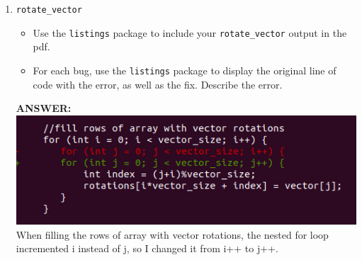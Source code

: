 \begin{enumerate}
    \item \texttt{rotate\_vector}
    \begin{itemize}
        \item Use the \texttt{listings} package to include your \texttt{rotate\_vector} output in the pdf.
        \item For each bug, use the \texttt{listings} package to display the original line of code with the error, as well as the fix.  Describe the error.
    \end{itemize}
    \textbf{ANSWER:} 
    \includegraphics[width=\textwidth]{Bug2.png}
    When filling the rows of array with vector rotations, the nested for loop incremented i instead of j, so I changed it from i++ to j++.
    
\end{enumerate}
